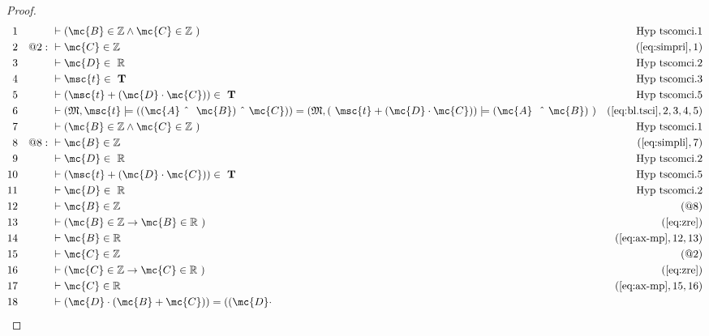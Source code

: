 \begin{proof}
\begin{align}
  1 &&  & \vdash ( \mc{B} \in \mathbb{Z} \wedge \mc{C} \in \mathbb{Z}
     ~)&\text{Hyp~tscomci.1}\notag%
  \\ 2 && @2:\  & \vdash \mc{C} \in \mathbb{Z}&(\mbox{\ref{eq:simpri}},1)\notag
  \\ 3 &&  & \vdash \mc{D} \in
     ~\mathbb{R}&\text{Hyp~tscomci.2}\notag%
  \\ 4 &&  & \vdash \msc{t} \in
     ~\mathbf{T}&\text{Hyp~tscomci.3}\notag%
  \\ 5 &&  & \vdash ( \msc{t} + ( \mc{D} \cdot \mc{C} ) ) \in
     ~\mathbf{T}&\text{Hyp~tscomci.5}\notag%
  \\ 6 &&  & \vdash ( \mathfrak{M} , \msc{t} \models ( ( \mc{A} ~\string^~
     ~\mc{B} ) ~\string^~ \mc{C} ) ) = ( \mathfrak{M} , (
     ~\msc{t} + ( \mc{D} \cdot \mc{C} ) ) \models ( \mc{A}
     ~~\string^~ \mc{B} )
     ~)&(\mbox{\ref{eq:bl.tsci}},2,3,4,5)\notag
  \\ 7 &&  & \vdash ( \mc{B} \in \mathbb{Z} \wedge \mc{C} \in \mathbb{Z}
     ~)&\text{Hyp~tscomci.1}\notag%
  \\ 8 && @8:\  & \vdash \mc{B} \in \mathbb{Z}&(\mbox{\ref{eq:simpli}},7)\notag
  \\ 9 &&  & \vdash \mc{D} \in
     ~\mathbb{R}&\text{Hyp~tscomci.2}\notag%
  \\ 10 &&  & \vdash ( \msc{t} + ( \mc{D} \cdot \mc{C} ) ) \in
     ~\mathbf{T}&\text{Hyp~tscomci.5}\notag%
  \\ 11 &&  & \vdash \mc{D} \in
     ~\mathbb{R}&\text{Hyp~tscomci.2}\notag%
  \\ 12 &&  & \vdash \mc{B} \in \mathbb{Z}&(@8)\notag
  \\ 13 &&  & \vdash ( \mc{B} \in \mathbb{Z} \rightarrow \mc{B} \in \mathbb{R}
     ~)&(\mbox{\ref{eq:zre}})\notag
  \\ 14 &&  & \vdash \mc{B} \in \mathbb{R}&(\mbox{\ref{eq:ax-mp}},12,13)\notag
  \\ 15 &&  & \vdash \mc{C} \in \mathbb{Z}&(@2)\notag
  \\ 16 &&  & \vdash ( \mc{C} \in \mathbb{Z} \rightarrow \mc{C} \in \mathbb{R}
     ~)&(\mbox{\ref{eq:zre}})\notag
  \\ 17 &&  & \vdash \mc{C} \in \mathbb{R}&(\mbox{\ref{eq:ax-mp}},15,16)\notag
  \\ 18 &&  & \vdash ( \mc{D} \cdot ( \mc{B} + \mc{C} ) ) = ( ( \mc{D} \cdot

\end{align}
\end{proof}
